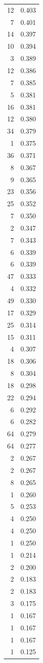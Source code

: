 \begin{tabular}{rr}
12 & 0.403 \\
7 & 0.401 \\
14 & 0.397 \\
10 & 0.394 \\
3 & 0.389 \\
12 & 0.386 \\
7 & 0.385 \\
5 & 0.381 \\
16 & 0.381 \\
12 & 0.380 \\
34 & 0.379 \\
1 & 0.375 \\
36 & 0.371 \\
8 & 0.367 \\
9 & 0.365 \\
23 & 0.356 \\
25 & 0.352 \\
7 & 0.350 \\
2 & 0.347 \\
7 & 0.343 \\
6 & 0.339 \\
6 & 0.339 \\
47 & 0.333 \\
4 & 0.332 \\
49 & 0.330 \\
17 & 0.329 \\
25 & 0.314 \\
15 & 0.311 \\
4 & 0.307 \\
18 & 0.306 \\
8 & 0.304 \\
18 & 0.298 \\
22 & 0.294 \\
6 & 0.292 \\
6 & 0.282 \\
64 & 0.279 \\
64 & 0.277 \\
2 & 0.267 \\
2 & 0.267 \\
8 & 0.265 \\
1 & 0.260 \\
5 & 0.253 \\
4 & 0.250 \\
4 & 0.250 \\
1 & 0.250 \\
1 & 0.214 \\
2 & 0.200 \\
2 & 0.183 \\
2 & 0.183 \\
3 & 0.175 \\
1 & 0.167 \\
1 & 0.167 \\
1 & 0.167 \\
1 & 0.125 \\
\bottomrule
\end{tabular}
